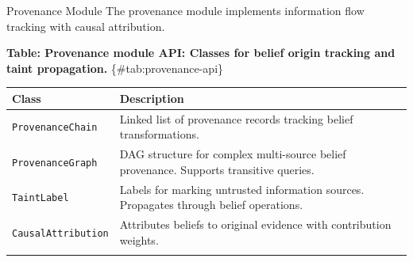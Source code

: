 \documentclass[
  ignorenonframetext,
]{beamer}
\newcounter{none} %
\begin{document}
\begin{frame}{Provenance Module}
\protect{}\label{sec:provenance-api}
The provenance module implements information flow tracking with causal
attribution.

\textbf{Table: Provenance module API: Classes for belief origin tracking
and taint propagation.} \{\#tab:provenance-api\}

{\def\LTcaptype{none} %
\begin{longtable}[]{@{}
  >{\raggedright\arraybackslash}p{}
  >{\raggedright\arraybackslash}p{}@{}}
\toprule\noalign{}
\begin{minipage}[b]{\linewidth}\raggedright
Class
\end{minipage} & \begin{minipage}[b]{\linewidth}\raggedright
Description
\end{minipage} \\
\midrule\noalign{}
\endhead
\texttt{ProvenanceChain} & Linked list of provenance records tracking
belief transformations. \\
\texttt{ProvenanceGraph} & DAG structure for complex multi-source belief
provenance. Supports transitive queries. \\
\texttt{TaintLabel} & Labels for marking untrusted information sources.
Propagates through belief operations. \\
\texttt{CausalAttribution} & Attributes beliefs to original evidence
with contribution weights. \\
\bottomrule\noalign{}
\end{longtable}
}
\end{frame}
\end{document}
